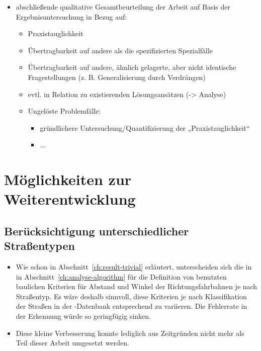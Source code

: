 \documentclass[../main/thesis.tex]{subfiles}
\begin{document}
\begin{itemize}
	\item abschließende qualitative Gesamtbeurteilung der Arbeit auf Basis der Ergebnisuntersuchung in Bezug auf:
	\begin{itemize}
		\item Praxistauglichkeit
		\item Übertragbarkeit auf andere als die spezifizierten Spezialfälle
		\item Übertragbarkeit auf andere, ähnlich gelagerte, aber nicht identische Fragestellungen (z. B. Generalisierung durch Verdrängen)
		\item evtl. in Relation zu existierenden Lösungsansätzen (-> Analyse)
		\item Ungelöste Problemfälle:
		\begin{itemize}
			\item gründlichere Untersuchung/Quantifizierung der „Praxistauglichkeit“
			\item ...
		\end{itemize}
	\end{itemize}
\end{itemize}



\section{Möglichkeiten zur Weiterentwicklung}



\subsection{Berücksichtigung unterschiedlicher Straßentypen}

\begin{itemize}

\item
Wie schon in Abschnitt~\ref{ch:result-trivial} erläutert, unterscheiden sich die in in Abschnitt~\ref{ch:analyse-algorithm} für die Definition von  benutzten baulichen Kriterien für Abstand und Winkel der Richtungsfahrbahnen je nach Straßentyp.
Es wäre deshalb sinnvoll, diese Kriterien je nach Klassifikation der Straßen in der \osm-Datenbank entsprechend zu variieren. Die Fehlerrate in der Erkennung würde so geringfügig sinken.

\item
Diese kleine Verbesserung konnte lediglich aus Zeitgründen nicht mehr als Teil dieser Arbeit umgesetzt werden.

\end{itemize}
\end{document}
